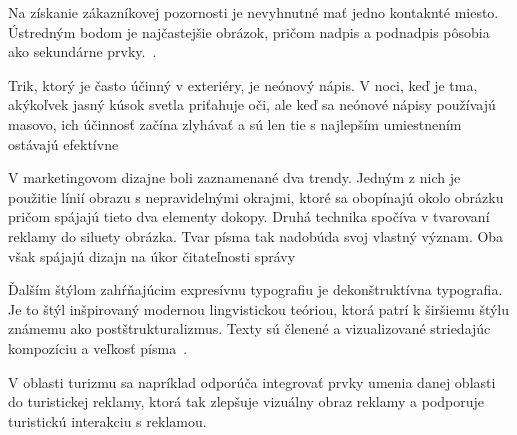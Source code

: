 \documentclass[11pt,a4paper]{article}
\begin{document}
Na získanie zákazníkovej pozornosti je nevyhnutné mať jedno kontaknté miesto. Ústredným bodom je najčastejšie obrázok, pričom nadpis a podnadpis pôsobia ako sekundárne prvky.~\cite{book-white}.


Trik, ktorý je často účinný v exteriéry, je neónový nápis. V noci, keď je tma, akýkoľvek jasný kúsok svetla priťahuje oči, ale keď sa neónové nápisy používajú masovo, ich účinnosť začína zlyhávať a sú len tie s najlepším umiestnením ostávajú efektívne~\cite{serial-kurt}


V marketingovom dizajne boli zaznamenané dva trendy. Jedným z nich je použitie línií obrazu s nepravidelnými okrajmi, ktoré sa obopínajú okolo obrázku pričom spájajú tieto dva elementy dokopy. Druhá technika spočíva v tvarovaní reklamy do siluety obrázka. Tvar písma tak nadobúda svoj vlastný význam. Oba však spájajú dizajn na úkor čitateľnosti správy~\cite{serial-moriarty}


Ďalším štýlom zahŕňajúcim expresívnu typografiu je dekonštruktívna typografia. Je to štýl inšpirovaný modernou lingvistickou teóriou, ktorá patrí k širšiemu štýlu známemu ako postštrukturalizmus. Texty sú členené a vizualizované striedajúc kompozíciu a veľkosť písma~\cite{thesis-donev}.


V oblasti turizmu sa napríklad odporúča integrovať prvky umenia danej oblasti do turistickej reklamy, ktorá tak zlepšuje vizuálny obraz reklamy a podporuje turistickú interakciu s reklamou.~\cite{el-sedek}



\newpage


\end{document}
